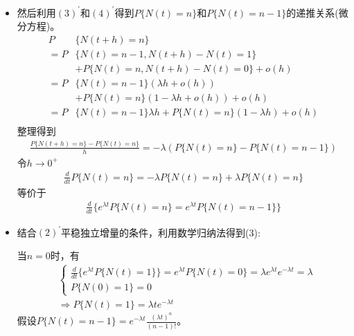 \begin{enumerate}
\begin{enumerate}[\bfseries 1)]
\begin{itemize}
			            \item 然后利用\((3)^{\prime}\)和\((4)^{\prime}\)得到\(P\{N(t)=n\}\)和\(P\{N(t)=n-1\}\)的递推关系(微分方程)。
			                  \begin{align*}
				                  P  & \{N(t+h)=n\}                                        \\
				                  =P & \{N(t)=n-1,N(t+h)-N(t)=1\}                          \\
				                     & +P\{N(t)=n,N(t+h)-N(t)=0\}+o(h)                     \\
				                  =P & \{N(t)=n-1\}(\lambda h+o(h))                        \\
				                     & +P\{N(t)=n\}(1-\lambda h+o(h))+o(h)                 \\
				                  =P & \{N(t)=n-1\}\lambda h+P\{N(t)=n\}(1-\lambda h)+o(h) \\
			                  \end{align*}
			                  整理得到
			                  \begin{align*}
				                  \frac{P\{N(t+h)=n\}-P\{N(t)=n\}}{h}=-\lambda (P\{N(t)=n\}-P\{N(t)=n-1\})
			                  \end{align*}
			                  令\(h\to 0^+\)
			                  \begin{align*}
				                  \frac{d}{dt}P\{N(t)=n\}=-\lambda P\{N(t)=n\}+\lambda P\{N(t)=n\}
			                  \end{align*}
			                  等价于
			                  \begin{align*}
				                  \frac{d}{dt}\{e^{\lambda t}P\{N(t)=n\}=e^{\lambda t}P\{N(t)=n-1\}\}
			                  \end{align*}

			            \item 结合\((2)^{\prime}\)平稳独立增量的条件，利用数学归纳法得到(3):

			                  当\(n=0\)时，有
			                  \begin{align*}
				                   & \left\{
				                  \begin{matrix}
					                  \frac{d}{dt}\{e^{\lambda t} P\{N(t)=1\}\}=e^{\lambda t}P\{N(t)=0\}
					                  =\lambda e^{\lambda t}e^{-\lambda t}=\lambda \\
					                  P\{N(0)=1\}=0
				                  \end{matrix}
				                  \right.                                             \\
				                   & \Rightarrow P\{N(t)=1\}=\lambda t e^{-\lambda t}
			                  \end{align*}
			                  假设\(P\{N(t)=n-1\}=e^{-\lambda t}\frac{(\lambda t)^n}{(n-1)!}\)。


\end{itemize}
\end{enumerate}
\end{enumerate}
